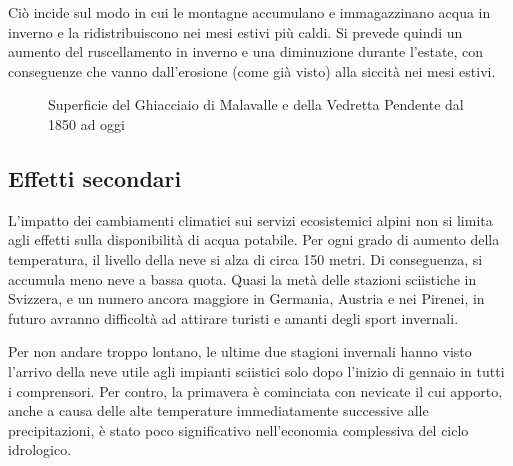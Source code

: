 \documentclass[14pt,a4paper]{article}
\begin{document}
		Ciò incide sul modo in cui le montagne accumulano e immagazzinano acqua in inverno e la ridistribuiscono nei mesi estivi più caldi. Si prevede quindi un aumento del ruscellamento in inverno e una diminuzione durante l'estate, con conseguenze che vanno dall'erosione (come già visto) alla siccità nei mesi estivi.
		
		
		\begin{figure}
		\caption{Superficie del Ghiacciaio di Malavalle e della Vedretta Pendente dal 1850 ad oggi}
		\label{diag:ridanna}
	\end{figure}
	
	
	
	\subsection{Effetti secondari}
		L'impatto dei cambiamenti climatici sui servizi ecosistemici alpini non si limita agli effetti sulla disponibilità di acqua potabile. Per ogni grado di aumento della temperatura, il livello della neve si alza di circa 150 metri. Di conseguenza, si accumula meno neve a bassa quota. Quasi la metà delle stazioni sciistiche in Svizzera, e un numero ancora maggiore in Germania, Austria e nei Pirenei, in futuro avranno difficoltà ad attirare turisti e amanti degli sport invernali.
		
		Per non andare troppo lontano, le ultime due stagioni invernali hanno visto l'arrivo della neve utile agli impianti sciistici solo dopo l'inizio di gennaio in tutti i comprensori. Per contro, la primavera è cominciata con nevicate il cui apporto, anche a causa delle alte temperature immediatamente successive alle precipitazioni, è stato poco significativo nell'economia complessiva del ciclo idrologico.
		
\end{document}
